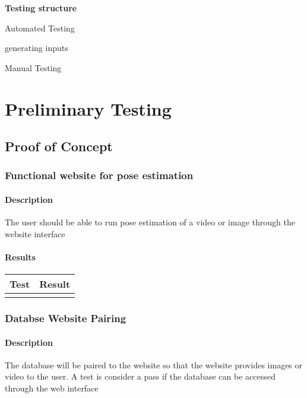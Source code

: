 \documentclass{scrreprt}
\begin{document}
    \textbf{Testing structure}

    Automated Testing

    \quad generating inputs

    Manual Testing

\chapter{Preliminary Testing}

\section{Proof of Concept}
\subsection{Functional website for pose estimation}
\subsubsection{Description}
\begin{flushleft}
The user should be able to run pose estimation of a video or image through the website interface
\end{flushleft}
\subsubsection{Results}
 \centering
 \begin{tabular}{||p{2.5cm}|p{2.5cm}||}
 \hline
 \textbf Test & \textbf Result\\
 \hline\hline
   &  \\ %
 \hline
 \end{tabular}

\subsection{Databse Website Pairing}
\subsubsection{Description}
\begin{flushleft}
The database will be paired to the website so that the website provides images or video to the user. A test is consider a pass if the database can be accessed through the web interface
\end{flushleft}
\end{document}
